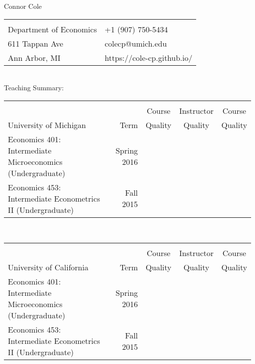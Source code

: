 \documentclass[10pt]{article}
\begin{document}
{\huge  Connor Cole}

\begin{tabular}{l@{\hskip 0.5in}l}
\multicolumn{2}{l}{} \\
Department of Economics & +1 (907) 750-5434\\
611 Tappan Ave & colecp@umich.edu \\
Ann Arbor, MI &  https://cole-cp.github.io/ 
\end{tabular} \\

Teaching Summary:

\begin{tabular}{lrccc}
\multicolumn{5}{l}{} \\
& & Course & Instructor & Course \\
University of Michigan & Term & Quality &  Quality &  Quality  \\
\hline
Economics 401: Intermediate Microeconomics (Undergraduate) & Spring 2016&&& \\
Economics 453: Intermediate Econometrics II (Undergraduate) & Fall 2015 &&&\\
\end{tabular} \\


\begin{tabular}{lrccc}
\multicolumn{5}{l}{} \\
& & Course & Instructor & Course \\
University of California & Term & Quality &  Quality &  Quality  \\
\hline
Economics 401: Intermediate Microeconomics (Undergraduate) & Spring 2016&&& \\
Economics 453: Intermediate Econometrics II (Undergraduate) & Fall 2015 &&&\\
\end{tabular} \\
\end{document}
